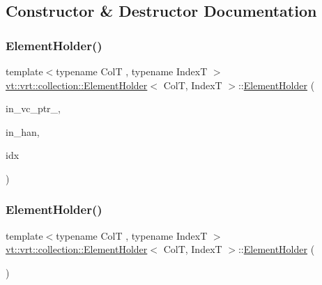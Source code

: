 \subsection{Constructor \& Destructor Documentation}
\mbox{\label{structvt_1_1vrt_1_1collection_1_1_element_holder_ae0407d670510c0c02141499b28da6d6e}} 
\subsubsection{\texorpdfstring{Element\+Holder()}{ElementHolder()}\hspace{0.1cm}{\footnotesize\ttfamily [1/2]}}
{\footnotesize\ttfamily template$<$typename ColT , typename IndexT $>$ \\
\hyperlink{structvt_1_1vrt_1_1collection_1_1_element_holder}{vt\+::vrt\+::collection\+::\+Element\+Holder}$<$ ColT, IndexT $>$\+::\hyperlink{structvt_1_1vrt_1_1collection_1_1_element_holder}{Element\+Holder} (\begin{DoxyParamCaption}\item[{\hyperlink{structvt_1_1vrt_1_1collection_1_1_element_holder_afc12d1a71ec8f735f1b7fe12a067c8a6}{Virtual\+Ptr\+Type}}]{in\+\_\+vc\+\_\+ptr\+\_\+,  }\item[{\hyperlink{namespacevt_af64846b57dfcaf104da3ef6967917573}{Handler\+Type} const \&}]{in\+\_\+han,  }\item[{IndexT const \&}]{idx }\end{DoxyParamCaption})}

\mbox{\label{structvt_1_1vrt_1_1collection_1_1_element_holder_acc214e54954edc0d8112c59ea7e51c02}} 
\subsubsection{\texorpdfstring{Element\+Holder()}{ElementHolder()}\hspace{0.1cm}{\footnotesize\ttfamily [2/2]}}
{\footnotesize\ttfamily template$<$typename ColT , typename IndexT $>$ \\
\hyperlink{structvt_1_1vrt_1_1collection_1_1_element_holder}{vt\+::vrt\+::collection\+::\+Element\+Holder}$<$ ColT, IndexT $>$\+::\hyperlink{structvt_1_1vrt_1_1collection_1_1_element_holder}{Element\+Holder} (\begin{DoxyParamCaption}\item[{\hyperlink{structvt_1_1vrt_1_1collection_1_1_element_holder}{Element\+Holder}$<$ ColT, IndexT $>$ \&\&}]{ }\end{DoxyParamCaption})\hspace{0.3cm}{\ttfamily [default]}}

